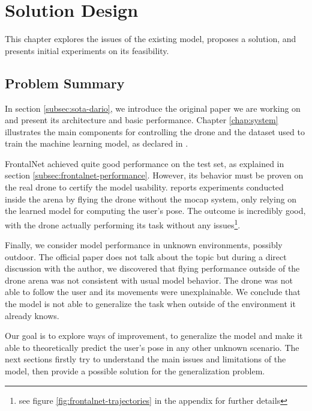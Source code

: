 \chapter{Solution Design}
\label{chap:design}


This chapter explores the issues of the existing model, proposes a solution, and presents initial experiments on its feasibility.




\section{Problem Summary}
\label{sec:frontalnet-generalization}

In section \ref{subsec:sota-dario}, we introduce the original paper we are working on and present its architecture and basic performance. Chapter \ref{chap:system} illustrates the main components for controlling the drone and the dataset used to train the machine learning model, as declared in \cite{mantegazza2019visionbased}.

\medskip

FrontalNet achieved quite good performance on the test set, as explained in section \ref{subsec:frontalnet-performance}. However, its behavior must be proven on the real drone to certify the model usability. \cite{mantegazza2019visionbased} reports experiments conducted inside the arena by flying the drone without the \gls{mocap} system, only relying on the learned model for computing the user's pose. The outcome is incredibly good, with the drone actually performing its task without any issues\footnote{see figure \ref{fig:frontalnet-trajectories} in the appendix for further details}.

Finally, we consider model performance in unknown environments, possibly outdoor. The official paper does not talk about the topic but during a direct discussion with the author, we discovered that flying performance outside of the drone arena was not consistent with usual model behavior. The drone was not able to follow the user and its movements were unexplainable. We conclude that the model is not able to generalize the task when outside of the environment it already knows.

\medskip

Our goal is to explore ways of improvement, to generalize the model and make it able to theoretically predict the user's pose in any other unknown scenario. The next sections firstly try to understand the main issues and limitations of the model, then provide a possible solution for the generalization problem.




